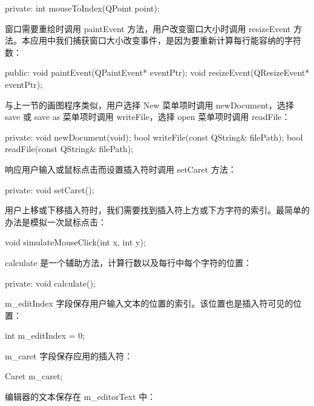 \begin{codebox}
  private:
    int mouseToIndex(QPoint point);
\end{codebox}

窗口需要重绘时调用 paintEvent 方法，用户改变窗口大小时调用 resizeEvent 方法。本应用中我们捕获窗口大小改变事件，是因为要重新计算每行能容纳的字符数：

\begin{codebox}
  public:
    void paintEvent(QPaintEvent* eventPtr);
    void resizeEvent(QResizeEvent* eventPtr);
\end{codebox}

与上一节的画图程序类似，用户选择 New 菜单项时调用 newDocument，选择 save 或 save as 菜单项时调用 writeFile，选择 open 菜单项时调用 readFile：

\begin{codebox}
  private:
    void newDocument(void);
    bool writeFile(const QString& filePath);
    bool readFile(const QString& filePath);
\end{codebox}

响应用户输入或鼠标点击而设置插入符时调用 setCaret 方法：

\begin{codebox}
  private:
    void setCaret();
\end{codebox}

用户上移或下移插入符时，我们需要找到插入符上方或下方字符的索引。最简单的办法是模拟一次鼠标点击：

\begin{codebox}
    void simulateMouseClick(int x, int y);
\end{codebox}

calculate 是一个辅助方法，计算行数以及每行中每个字符的位置：

\begin{codebox}
  private:
    void calculate();
\end{codebox}

m\_editIndex 字段保存用户输入文本的位置的索引。该位置也是插入符可见的位置：

\begin{codebox}
    int m_editIndex = 0;
\end{codebox}

m\_caret 字段保存应用的插入符：

\begin{codebox}
    Caret m_caret;
\end{codebox}

编辑器的文本保存在 m\_editorText 中：

